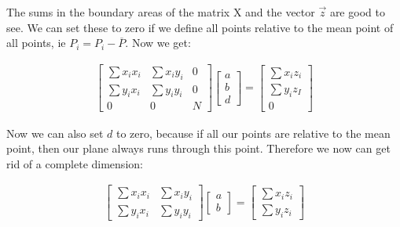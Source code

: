 \documentclass[11pt,oneside,openright]{mpreport}
\begin{document}
The sums in the boundary areas of the matrix X and the vector $\vec{z}$ are good to see. We can set these to zero if we define all points relative to the mean point of all points,
ie $P_i = P_i - \overline{P}$. Now we get:

\begin{align*}
\begin{bmatrix}
\sum x_i x_i & \sum x_i y_i & 0 \\
\sum y_i x_i & \sum y_i y_i & 0 \\
0 & 0 & N
\end{bmatrix} 
\begin{bmatrix}
a \\
b \\
d 
\end{bmatrix} 
 = 
\begin{bmatrix}
\sum x_i z_i \\
\sum y_i z_I \\
0 
\end{bmatrix} 
\end{align*}

Now we can also set $d$ to zero, because if all our points are relative to the mean point, then our plane always runs through this point. Therefore we now can get rid of a complete dimension:

\begin{align*}
\begin{bmatrix}
\sum x_i x_i & \sum x_i y_i \\
\sum y_i x_i & \sum y_i y_i
\end{bmatrix} 
\begin{bmatrix}
a \\
b 
\end{bmatrix} 
 = 
\begin{bmatrix}
\sum x_i z_i \\
\sum y_i z_i
\end{bmatrix} 
\end{align*}
\end{document}
